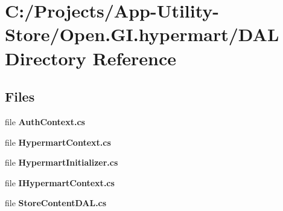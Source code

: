 \section{C\+:/\+Projects/\+App-\/\+Utility-\/\+Store/\+Open.G\+I.\+hypermart/\+D\+AL Directory Reference}
\label{dir_6a549aaa594efc62623ae95545ecc323}
\subsection*{Files}
\begin{DoxyCompactItemize}
\item 
file \textbf{ Auth\+Context.\+cs}
\item 
file \textbf{ Hypermart\+Context.\+cs}
\item 
file \textbf{ Hypermart\+Initializer.\+cs}
\item 
file \textbf{ I\+Hypermart\+Context.\+cs}
\item 
file \textbf{ Store\+Content\+D\+A\+L.\+cs}
\end{DoxyCompactItemize}
